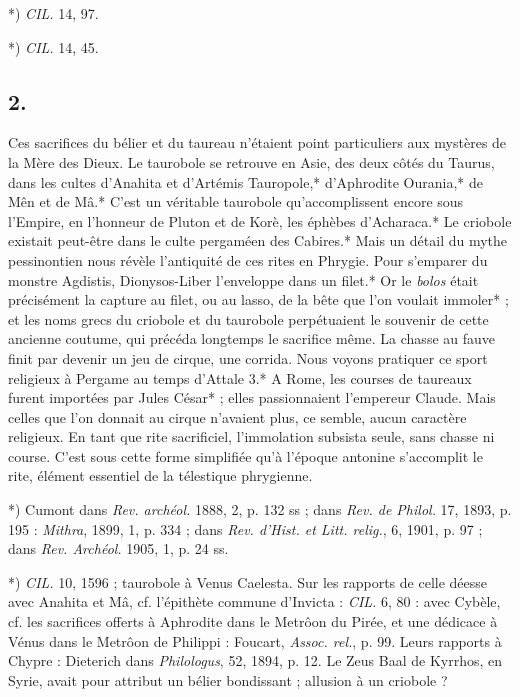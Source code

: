 \documentclass[a4paper, 11pt, oneside, polutonikogreek, french]{article}
\begin{document}
*) \emph{CIL.} 14, 97.

*) \emph{CIL.} 14, 45.

\subsection{2.}

Ces sacrifices du bélier et du taureau n'étaient point particuliers aux mystères de la Mère des Dieux. Le taurobole se retrouve en Asie, des deux côtés du Taurus, dans les cultes d'Anahita et d'Artémis Tauropole,* d'Aphrodite Ourania,* de Mên et de Mâ.* C'est un véritable taurobole qu'accomplissent encore sous l'Empire, en l'honneur de Pluton et de Korè, les éphèbes d'Acharaca.* Le criobole existait peut-être dans le culte pergaméen des Cabires.* Mais un détail du mythe pessinontien nous révèle l'antiquité de ces rites en Phrygie. Pour s'emparer du monstre Agdistis, Dionysos-Liber l'enveloppe dans un filet.* Or le \emph{bolos} était précisément la capture au filet, ou au lasso, de la bête que l'on voulait immoler* ; et les noms grecs du criobole et du taurobole perpétuaient le souvenir de cette ancienne coutume, qui précéda longtemps le sacrifice même. La chasse au fauve finit par devenir un jeu de cirque, une corrida. Nous voyons pratiquer ce sport religieux à Pergame au temps d'Attale 3.* A Rome, les courses de taureaux furent importées par Jules César* ; elles passionnaient l'empereur Claude. Mais celles que l'on donnait au cirque n'avaient plus, ce semble, aucun caractère religieux. En tant que rite sacrificiel, l'immolation subsista seule, sans chasse ni course. C'est sous cette forme simplifiée qu'à l'époque antonine s'accomplit le rite, élément essentiel de la télestique phrygienne.

*) Cumont dans \emph{Rev. archéol.} 1888, 2, p. 132 ss ; dans \emph{Rev. de Philol.} 17, 1893, p. 195 : \emph{Mithra}, 1899, 1, p. 334 ; dans \emph{Rev. d'Hist. et Litt. relig.}, 6, 1901, p. 97 ; dans \emph{Rev. Archéol.} 1905, 1, p. 24 ss.

*) \emph{CIL.} 10, 1596 ; taurobole à Venus Caelesta. Sur les rapports de celle déesse avec Anahita et Mâ, cf. l'épithète commune d'Invicta : \emph{CIL.} 6, 80 : avec Cybèle, cf. les sacrifices offerts à Aphrodite dans le Metrôon du Pirée, et une dédicace à Vénus dans le Metrôon de Philippi : Foucart, \emph{Assoc. rel.}, p. 99. Leurs rapports à Chypre : Dieterich dans \emph{Philologus}, 52, 1894, p. 12. Le Zeus Baal de Kyrrhos, en Syrie, avait pour attribut un bélier bondissant ; allusion à un criobole ?
\end{document}
